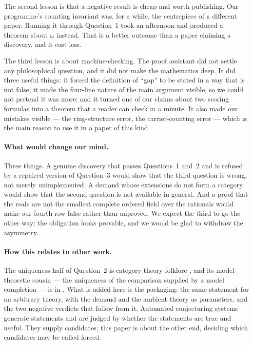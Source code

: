 \documentclass[aps,prd,preprint,superscriptaddress,amsmath,amssymb]{revtex4-2}
\begin{document}
The second lesson is that a negative result is cheap and worth publishing.  Our
programme's counting invariant was, for a while, the centrepiece of a different
paper.  Running it through Question~1 took an afternoon and produced a theorem
about $\omega$ instead.  That is a better outcome than a paper claiming a
discovery, and it cost less.

The third lesson is about machine-checking.  The proof assistant did not settle any
philosophical question, and it did not make the mathematics deep.  It did three
useful things: it forced the definition of ``gap'' to be stated in a way that is not
false; it made the four-line nature of the main argument visible, so we could not
pretend it was more; and it turned one of our claims about two scoring formulas
into a theorem that a reader can check in a minute.  It also made our mistakes
visible --- the ring-structure error, the carrier-counting error --- which is the
main reason to use it in a paper of this kind.

\paragraph{What would change our mind.}
Three things.  A genuine discovery that passes Questions~1 and~2 and is refused by a
repaired version of Question~3 would show that the third question is wrong, not
merely unimplemented.  A demand whose extensions do not form a category would show
that the second question is not available in general.  And a proof that the reals
are not the smallest complete ordered field over the rationals would make our
fourth row false rather than unproved.  We expect the third to go the other way:
the obligation looks provable, and we would be glad to withdraw the asymmetry.

\paragraph{How this relates to other work.}
The uniqueness half of Question~2 is category theory folklore \cite{MacLane1971},
and its model-theoretic cousin --- the uniqueness of the comparison supplied by a
model completion --- is in \cite{EklofSabbagh1971}.  What is added here is the
packaging: the same statement for an arbitrary theory, with the demand and the
ambient theory as parameters, and the two negative verdicts that follow from it.
Automated conjecturing systems \cite{lenat1976,davies2021,raayoni2021,romera2024}
generate statements and are judged by whether the statements are true and useful.
They supply candidates; this paper is about the other end, deciding which candidates
may be called forced.
\end{document}

